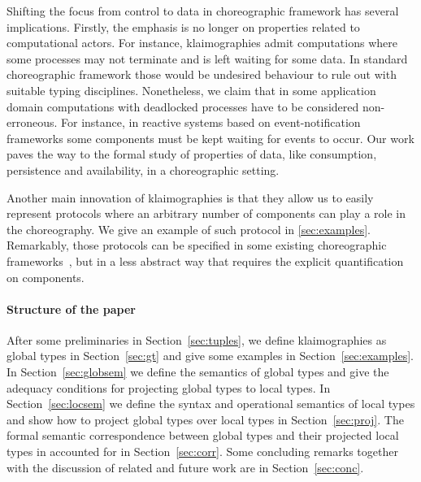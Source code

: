 Shifting the focus from control to data in choreographic framework has
several implications.
%
Firstly, the emphasis is no longer on properties related to
computational actors.
%
For instance, klaimographies admit computations where some processes
may not terminate and is left waiting for some data.
%
In standard choreographic framework those would be undesired behaviour
to rule out with suitable typing disciplines.
%
Nonetheless, we claim that in some application domain computations with
deadlocked processes have to be considered non-erroneous.
%
For instance, in reactive systems based on event-notification
frameworks some  components must be kept waiting for
events to occur.
%
Our work paves the way to the formal study of properties of data, like consumption, persistence and availability, in a choreographic setting.

Another main innovation of klaimographies is that they allow us to easily
represent protocols where an arbitrary number of components can
play a role in the choreography.
%
We give an example of such protocol in \cref{sec:examples}.
%
Remarkably, those protocols can be specified in some existing
choreographic frameworks~\cite{ydbh10,chjny19}, but in a less abstract way
that requires the explicit quantification on components.

\paragraph{Structure of the paper}
After some preliminaries in Section~\ref{sec:tuples}, we define klaimographies as global types in Section~\ref{sec:gt} and give some examples in Section~\ref{sec:examples}.
In Section~\ref{sec:globsem} we define the semantics of global types and give the adequacy conditions for projecting global types to local types.
In Section~\ref{sec:locsem} we define the syntax and operational semantics of local types and show how to project global types over local types in Section~\ref{sec:proj}.
The formal semantic correspondence between global types and their projected local types in accounted for in Section~\ref{sec:corr}.
Some concluding remarks together with the discussion of related and future work are in Section~\ref{sec:conc}.


